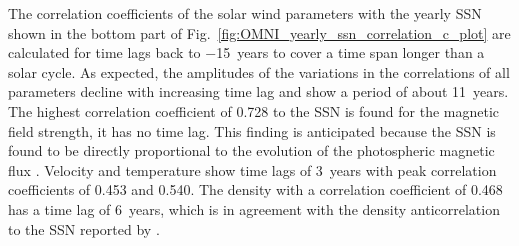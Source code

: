 \documentclass[]{aa}
\begin{document}
	The correlation coefficients of the solar wind parameters with the yearly SSN shown in the bottom part of Fig.~\ref{fig:OMNI_yearly_ssn_correlation_c_plot} are calculated for time lags back to \num{-15}~years to cover a time span longer than a solar cycle. As expected, the amplitudes of the variations in the correlations of all parameters decline with increasing time lag and show a period of about 11~years. The highest correlation coefficient of 0.728 to the SSN is found for the magnetic field strength, it has no time lag. This finding is anticipated because the SSN is found to be directly proportional to the evolution of the photospheric magnetic flux \citep{Smith2003}.
	Velocity and temperature show time lags of 3~years with peak correlation coefficients of 0.453 and 0.540. The density with a correlation coefficient of 0.468 has a time lag of 6~years, which is in agreement with the density anticorrelation to the SSN reported by \citet{Bougeret1984}.
\end{document}
